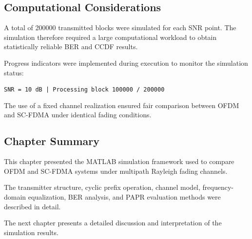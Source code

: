 \subsection{Computational Considerations}

A total of 200000 transmitted blocks were simulated for each SNR point.
The simulation therefore required a large computational workload to obtain
statistically reliable BER and CCDF results.

Progress indicators were implemented during execution to monitor the
simulation status:

\begin{center}
\texttt{SNR = 10 dB | Processing block 100000 / 200000}
\end{center}

The use of a fixed channel realization ensured fair comparison between
OFDM and SC-FDMA under identical fading conditions.

\subsection{Chapter Summary}

This chapter presented the MATLAB simulation framework used to compare
OFDM and SC-FDMA systems under multipath Rayleigh fading channels.

The transmitter structure, cyclic prefix operation, channel model,
frequency-domain equalization, BER analysis, and PAPR evaluation methods
were described in detail.

The next chapter presents a detailed discussion and interpretation of the
simulation results.